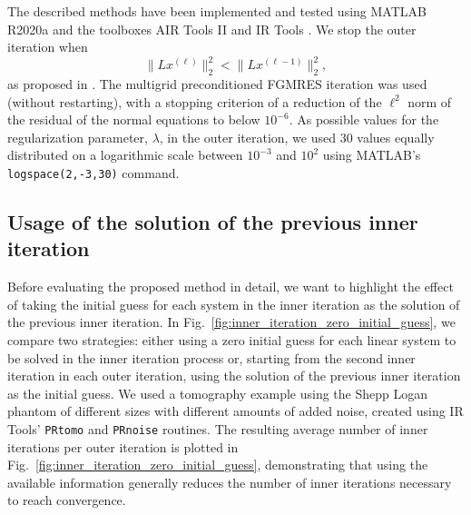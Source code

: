 The described methods have been implemented and tested using MATLAB R2020a and the toolboxes AIR Tools II \cite{art:HANS18} and IR Tools \cite{art:GAZZ19}. We stop the outer iteration when
\[
\|L x^{(\ell)}\|_2^2 < \|L x^{(\ell-1)}\|_2^2,
\]
as proposed in \cite{Gazzola_etal_2020}. The multigrid preconditioned
FGMRES iteration was used (without restarting), with a stopping
criterion of a reduction of the $\ell^2$ norm of the residual of the normal equations to below $10^{-6}$. As possible values for the regularization parameter, $\lambda$, in the outer iteration, we used 30 values equally distributed on a logarithmic scale between $10^{-3}$ and $10^{2}$ using MATLAB's \texttt{logspace(2,-3,30)} command.

\subsection{Usage of the solution of the previous inner iteration}
Before evaluating the proposed method in detail, we want to highlight the effect of taking the initial guess for each system in the inner iteration as the solution of the previous inner iteration.  In Fig.~\ref{fig:inner_iteration_zero_initial_guess}, we compare two strategies: either using a zero initial guess for each linear system to be solved in the inner iteration process or, starting from the second inner iteration in each outer iteration, using the solution of the previous inner iteration as the initial guess. We used a tomography example using the Shepp Logan phantom of different sizes with different amounts of added noise, created using IR Tools' \cite{art:GAZZ19} \texttt{PRtomo} and \texttt{PRnoise} routines. The resulting average number of inner iterations per outer iteration is plotted in Fig.~\ref{fig:inner_iteration_zero_initial_guess}, demonstrating that using the available information generally reduces the number of inner iterations necessary to reach convergence.
